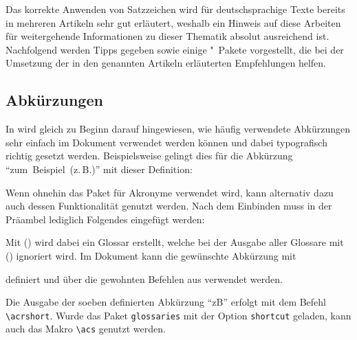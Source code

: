 \documentclass[%
  english,ngerman,%
  cdgeometry=no,DIV=12,%
  automark,%
  listof=toc,%
]{tudscrartcl}
\newcommand*\newabbreviation[4][]{%
    \newacronym[type=abbreviation,#1]{#2}{#3}{#4}%
  }%
\begin{document}
Das korrekte Anwenden von Satzzeichen wird für deutschsprachige Texte bereits 
in mehreren Artikeln \cite{neubauer1996,neubauer1997,struckmann2007,bier2009} 
sehr gut erläutert, weshalb ein Hinweis auf diese Arbeiten für weitergehende 
Informationen zu dieser Thematik absolut ausreichend ist. Nachfolgend werden 
Tipps gegeben sowie einige "~Pakete vorgestellt, die bei der 
Umsetzung der in den genannten Artikeln erläuterten Empfehlungen helfen.


\subsection{Abkürzungen}
In \cite{struckmann2007} wird gleich zu Beginn darauf hingewiesen, wie häufig 
verwendete Abkürzungen sehr einfach im Dokument verwendet werden können und 
dabei typografisch richtig gesetzt werden. Beispielsweise gelingt dies für die 
Abkürzung \enquote{zum~Beispiel~(z.\,B.)} mit dieser Definition:
%
\begin{Hint}
\newcommand{\zB}{\mbox{z.\,B.}\xspace}
\end{Hint}
%
Wenn ohnehin das Paket  für Akronyme verwendet wird, kann 
alternativ dazu auch dessen Funktionalität genutzt werden. Nach dem Einbinden 
muss in der Präambel lediglich Folgendes eingefügt werden:
%
\begin{Hint}
  \newcommand*{\newabbreviation}[4][]{%
    \newacronym[type=abbreviation,#1]{#2}{\mbox{#3\xspace}}{#4}%
  }%
\end{Hint}
%
Mit () wird dabei ein Glossar 
erstellt, welche bei der Ausgabe aller Glossare mit 
() ignoriert wird. Im Dokument kann 
die gewünschte Abkürzung mit 
%
\begin{Hint*}
\newabbreviation{zB}{z.\,B.}{zum Beispiel}
\end{Hint*}
%
definiert und über die gewohnten Befehlen aus  verwendet 
werden.
%
\begin{Hint*}
Die Ausgabe der soeben definierten Abkürzung \enquote{\acrshort{zB}}
erfolgt mit dem Befehl \texttt{\textbackslash acrshort}. Wurde das
Paket \texttt{glossaries} mit der Option \texttt{shortcut} geladen, 
kann auch das Makro \texttt{\textbackslash acs} genutzt werden.
\end{Hint*}
\end{document}
